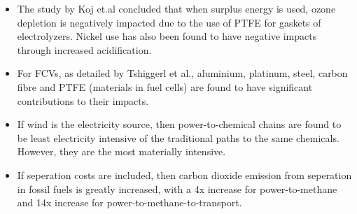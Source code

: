 \documentclass[a4paper]{article}
\begin{document}
\begin{itemize}
    \item The study by Koj et.al concluded that when surplus energy is used, ozone depletion is negatively impacted due to the use of PTFE for gaskets of electrolyzers. Nickel use has also been found to have negative impacts through increased acidification.
    \item For FCVs, as detailed by Tshiggerl et al., aluminium, platinum, steel, carbon fibre and PTFE (materials in fuel cells) are found to have significant contributions to their impacts.
    \item If wind is the electricity source, then power-to-chemical chains are found to be least electricity intensive of the traditional paths to the same chemicals. However, they are the most materially intensive.
    \item If seperation costs are included, then carbon dioxide emission from seperation in fossil fuels is greatly increased, with a 4x increase for power-to-methane and 14x increase for power-to-methane-to-transport.
\end{itemize}
\pagebreak
\end{document}
